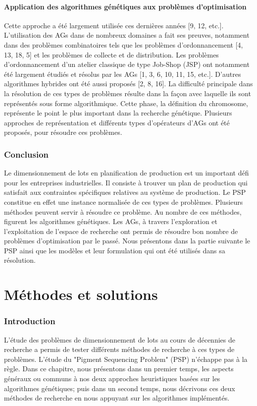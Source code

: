 \documentclass[12pt,a4paper]{article}
\begin{document}
	\subsection{Application des algorithmes génétiques aux problèmes d'optimisation}
	
	Cette approche a été largement utilisée ces dernières années [9, 12, etc.]. L’utilisation des AGs dans de nombreux domaines a fait ses preuves, notamment dans des problèmes combinatoires tels que les problèmes d’ordonnancement [4, 13, 18, 5] et les problèmes de collecte et de distribution. Les problèmes d’ordonnancement d’un atelier classique de type Job-Shop (JSP) ont notamment été largement étudiés et résolus par les AGs [1, 3, 6, 10, 11, 15, etc.]. D’autres algorithmes hybrides ont été aussi proposés [2, 8, 16]. La difficulté principale dans la résolution de ces types de problèmes résulte dans la façon avec laquelle ils sont représentés sous forme algorithmique. Cette phase, la définition du chromosome, représente le point le plus important dans la recherche génétique. Plusieurs approches de représentation
et différents types d’opérateurs d’AGs ont été proposés, pour résoudre ces problèmes.
	
	\section*{Conclusion}
	Le dimensionnement de lots en planification de production est un important défi pour les entreprises industrielles. Il consiste à trouver un plan de production qui satisfait aux contraintes spécifiques relatives au système de production. Le PSP constitue en effet une instance normalisée de ces types de problèmes. Plusieurs méthodes peuvent servir à résoudre ce problème. Au nombre de ces méthodes, figurent les algorithmes génétiques. Les AGs, à travers l'exploration et l'exploitation de l'espace de recherche ont permis de résoudre bon nombre de problèmes d'optimisation par le passé. Nous présentons dans la partie suivante le PSP ainsi que les modèles et leur formulation qui ont été utilisés dans sa résolution.		
		
	\newpage
	
	\part{Méthodes et solutions}
	\setcounter{section}{0}
	
	\section*{Introduction}
	L'étude des problèmes de dimensionnement de lots au cours de décennies de recherche a permis de tester différents méthodes de recherche à ces types de problèmes. L'étude du "Pigment Sequencing Problem" (PSP) n'échappe pas à la règle. Dans ce chapitre, nous présentons dans un premier temps, les aspects généraux ou communs à nos deux approches heuristiques basées sur les algorithmes génétiques; puis dans un second temps, nous décrivons ces deux méthodes de recherche en nous appuyant sur les algorithmes implémentés.
	
\end{document}
